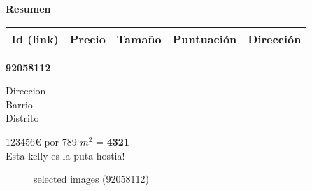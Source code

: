 \documentclass[10pt,a4paper]{report}
\begin{document}
{\LARGE \textbf{Resumen}}

\begin{center}
\begin{tabular}{|c|c|c|c|c|}
\hline
Id (link) & Precio & Tamaño & Puntuación & Dirección \\\hline\hline
\end{tabular}
\end{center}


\newpage
\begin{center}
\begin{large}
\textbf{92058112}\\[10px]
\end{large}
Direccion\\
Barrio\\
Distrito\\
\end{center}
{\large 123456€ por 789 $m^2$ = \color{blue} \textbf{4321}}\\[20px]
Esta kelly es la puta hostia!
\begin{figure}[htbp]
\caption{selected images (92058112)}
\end{figure}

\end{document}
